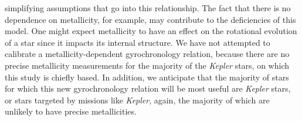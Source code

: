 \documentclass[useAMS, usenatbib]{mn2e}
\begin{document}
simplifying assumptions that go into this relationship.
The fact that there is no dependence on metallicity, for example, may
contribute to the deficiencies of this model.
One might expect metallicity to have an effect on the rotational evolution of
a star since it impacts its internal structure.
We have not attempted to calibrate a metallicity-dependent gyrochronology
relation, because there are no precise metallicity measurements for the
majority of the {\it Kepler} stars, on which this study is chiefly based.
In addition, we anticipate that the majority of stars for which this new
gyrochronology relation will be most useful are {\it Kepler} stars, or stars
targeted by missions like {\it Kepler}, again, the majority of which are unlikely to
have precise metallicities.  %

\begin{figure}
\begin{center}
\end{center}
\end{figure}
\end{document}

